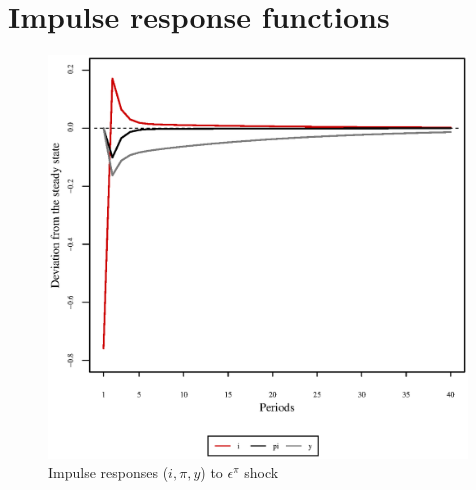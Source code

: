 \pagebreak

\section{Impulse response functions}

\begin{figure}[h]
\centering
\begin{minipage}{0.5\textwidth}
\vspace*{-3em}
\centering
\includegraphics[width=0.99\textwidth, scale=0.55]{plots/plot_21.eps}
\caption{Impulse responses ($i, \pi, y$) to $\epsilon^{\pi}$ shock}
\end{minipage}
\end{figure}
